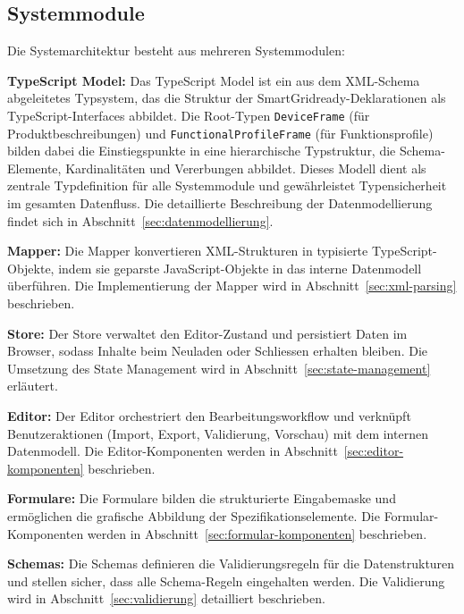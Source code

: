 \documentclass[a4paper,12pt]{article}
\newcommand{\code}[1]{\texttt{#1}}
\begin{document}
\subsection{Systemmodule}

Die Systemarchitektur besteht aus mehreren Systemmodulen: \newline

\noindent\textbf{TypeScript Model:}
Das TypeScript Model ist ein aus dem XML-Schema abgeleitetes Typsystem, das die Struktur der 
SmartGridready-Deklarationen als TypeScript-Interfaces abbildet. Die Root-Typen \code{DeviceFrame} 
(für Produktbeschreibungen) und \code{FunctionalProfileFrame} (für Funktionsprofile) bilden dabei 
die Einstiegspunkte in eine hierarchische Typstruktur, die Schema-Elemente, Kardinalitäten und 
Vererbungen abbildet. Dieses Modell dient als zentrale Typdefinition für alle Systemmodule und 
gewährleistet Typensicherheit im gesamten Datenfluss. Die detaillierte Beschreibung der 
Datenmodellierung findet sich in Abschnitt~\ref{sec:datenmodellierung}.
\newline

\noindent\textbf{Mapper:}
Die Mapper konvertieren XML-Strukturen in typisierte TypeScript-Objekte, indem sie geparste 
JavaScript-Objekte in das interne Datenmodell überführen. Die Implementierung der 
Mapper wird in Abschnitt~\ref{sec:xml-parsing} beschrieben.
\newline

\noindent\textbf{Store:}
Der Store verwaltet den Editor-Zustand und persistiert Daten im Browser, sodass Inhalte beim 
Neuladen oder Schliessen erhalten bleiben. Die Umsetzung des State Management wird in 
Abschnitt~\ref{sec:state-management} erläutert.
\newline

\noindent\textbf{Editor:}
Der Editor orchestriert den Bearbeitungsworkflow und verknüpft Benutzeraktionen (Import, Export, 
Validierung, Vorschau) mit dem internen Datenmodell. Die Editor-Komponenten werden in 
Abschnitt~\ref{sec:editor-komponenten} beschrieben.
\newline

\noindent\textbf{Formulare:}
Die Formulare bilden die strukturierte Eingabemaske und ermöglichen die grafische Abbildung der 
Spezifikationselemente. Die Formular-Komponenten werden in Abschnitt~\ref{sec:formular-komponenten} 
beschrieben.
\newline

\noindent\textbf{Schemas:}
Die Schemas definieren die Validierungsregeln für die Datenstrukturen und stellen sicher, dass alle 
Schema-Regeln eingehalten werden. Die Validierung wird in Abschnitt~\ref{sec:validierung} 
detailliert beschrieben.
\newline
\end{document}
